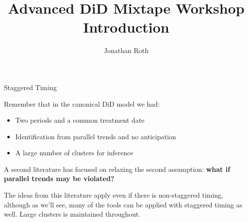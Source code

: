 \documentclass[aspectratio = 169, 13pt]{beamer}
\author{Jonathan Roth}
\title[Advanced DiD Mixtape Workshop]{Advanced DiD Mixtape Workshop \\ Introduction}
\begin{document}


\begin{frame}{Staggered Timing}
\begin{wideitemize}
    \item
    Remember that in the canonical DiD model we had:
    
    \begin{itemize}
        \item 
        Two periods and a common treatment date
        
        \item
        Identification from parallel trends and no anticipation
        
        \item
        A large number of clusters for inference
    \end{itemize}
    
    \item
    A second literature has focused on relaxing the second assumption: \textbf{what if parallel trends may be violated?}
    
    \item
    The ideas from this literature apply even if there is non-staggered timing, although as we'll see, many of the tools can be applied with staggered timing as well. Large clusters is maintained throughout. 
    
\end{wideitemize}

\end{frame}
\end{document}
